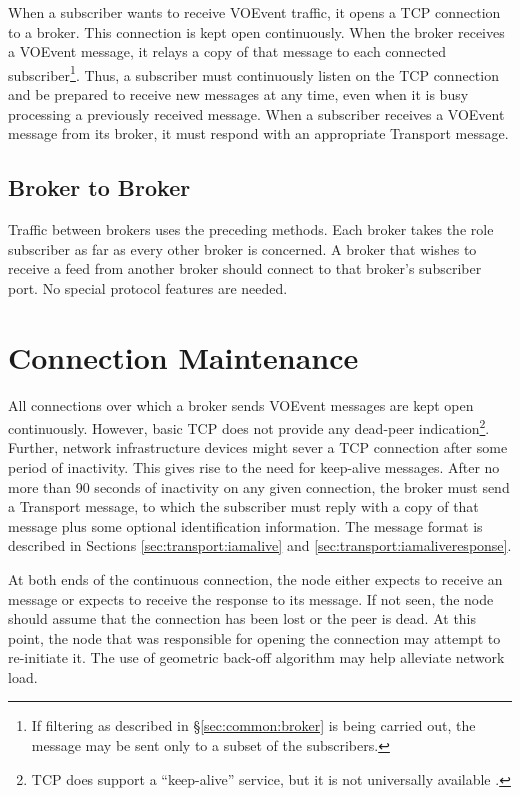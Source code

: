 \documentclass[a4paper,11pt]{ivoa}
\begin{document}
When a subscriber wants to receive VOEvent traffic, it opens a TCP connection
to a broker. This connection is kept open continuously. When the broker
receives a VOEvent message, it relays a copy of that message to each connected
subscriber\footnote{If filtering as described in \S\ref{sec:common:broker} is
being carried out, the message may be sent only to a subset of the
subscribers.}.  Thus, a subscriber must continuously listen on the TCP
connection and be prepared to receive new messages at any time, even when it
is busy processing a previously received message. When a subscriber receives a
VOEvent message from its broker, it must respond with an appropriate Transport
message.

\subsection{Broker to Broker}
\label{sec:node:brokertobroker}

Traffic between brokers uses the preceding methods. Each broker takes the role
subscriber as far as every other broker is concerned. A broker that wishes to
receive a feed from another broker should connect to that broker's subscriber
port. No special protocol features are needed.

\section{Connection Maintenance}
\label{sec:maintenance}

All connections over which a broker sends VOEvent messages are kept open
continuously. However, basic TCP does not provide any dead-peer
indication\footnote{ TCP does support a ``keep-alive'' service, but it is not
universally available \citep{Braden:1989}.}. Further, network infrastructure
devices might sever a TCP connection after some period of inactivity. This
gives rise to the need for keep-alive messages. After no more than 90 seconds
of inactivity on any given connection, the broker must send a Transport
 message, to which the subscriber must reply with a copy of
that message plus some optional identification information. The message format
is described in Sections \ref{sec:transport:iamalive} and
\ref{sec:transport:iamaliveresponse}.

At both ends of the continuous connection, the node either expects to receive
an  message or expects to receive the response to its
 message. If not seen, the node should assume that the
connection has been lost or the peer is dead. At this point, the node that was
responsible for opening the connection may attempt to re-initiate it. The use
of geometric back-off algorithm may help alleviate network load.
\end{document}
